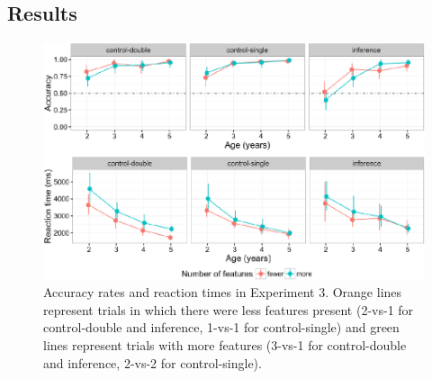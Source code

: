 \documentclass[a4paper,man,apacite,floatsintext]{apa6}
\newenvironment{CodeChunk}{}{}
\begin{document}
\subsection{Results}\label{results-1}

\begin{CodeChunk}
\begin{figure}[H]

{\centering \includegraphics{figs/ipaccrt-1} 

}

\caption[Accuracy rates and reaction times in Experiment 3]{Accuracy rates and reaction times in Experiment 3. Orange lines represent trials in which there were less features present (2-vs-1 for control-double and inference, 1-vs-1 for control-single) and green lines represent trials with more features (3-vs-1 for control-double and inference, 2-vs-2 for control-single).}\label{fig:ipaccrt}
\end{figure}
\end{CodeChunk}
\end{document}
